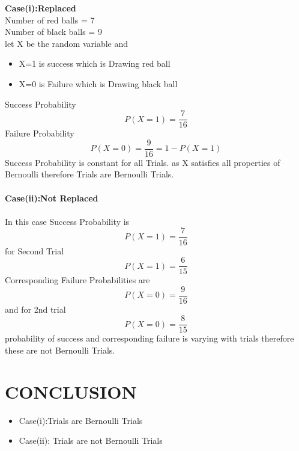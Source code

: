 \documentclass[journal,12pt,twocolumn]{IEEEtran}
\begin{document}
\textbf{Case(i):Replaced} \\ 
Number of red balls = 7\\
Number of black balls = 9\\
let X be the random variable and 
\begin{itemize}
    \item X=1 is success which is Drawing red ball
    \item X=0 is Failure which is Drawing black ball
\end{itemize}
Success Probability 
\begin{equation}
    P(X=1) = \frac{7}{16} 
\end{equation}
Failure Probability
\begin{equation}
     P(X=0) = \frac{9}{16} = 1-P(X=1)
\end{equation}
 Success Probability is  constant for all Trials.
 as X satisfies all properties of Bernoulli therefore Trials are Bernoulli Trials.\\ \\
\textbf{Case(ii):Not Replaced} \\ \\
In this case Success Probability is 
\begin{equation}
    P(X=1) =\frac{7}{16}
\end{equation}
 for Second Trial 
\begin{equation}
     P(X=1) = \frac{6}{15} 
\end{equation} 
 Corresponding Failure Probabilities are 
 \begin{equation}
     P(X=0) = \frac{9}{16}
 \end{equation} and for 2nd trial 
 \begin{equation}
     P(X=0) = \frac{8}{15}
 \end{equation}  
  probability of success and corresponding failure is varying with trials therefore these are not Bernoulli Trials. 
\section{\textbf{CONCLUSION}}
\begin{itemize}
    \item Case(i):Trials are Bernoulli Trials 
    \item Case(ii): Trials are not Bernoulli Trials
\end{itemize}
\end{document}
